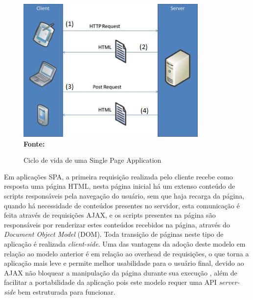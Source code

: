 \begin{figure}[!ht]
	\centering	
	\caption[\hspace{0.1cm} Ciclo de vida de uma Single Page Application.]{Ciclo de vida de uma Single Page Application}
	  \vspace{-0.4cm}
	\includegraphics[width=.8\textwidth]{figuras/spa.png}
	 \vspace{-0.3cm}
	\\\textbf{\footnotesize Fonte: \cite{spa02}}
	\label{fig:spa}
\end{figure}

Em aplicações SPA, a primeira requisição realizada pelo cliente recebe como resposta uma página HTML, nesta página inicial há um extenso conteúdo de
scripts responsáveis pela navegação do usuário, sem que haja recarga da página, quando há necessidade de conteúdos presentes no servidor, esta 
comunicação é feita através de requisições AJAX, e os scripts presentes na página são responsáveis por renderizar estes conteúdos recebidos na página,
através do \textit{Document Object Model} (DOM). Toda transição de páginas neste tipo de aplicação é realizada \textit{client-side}. Uma das vantagens
da adoção deste modelo em relação ao modelo anterior é em relação ao overhead de requisições, o que torna a aplicação mais leve e permite melhor 
usabilidade para o usuário final, devido ao AJAX não bloquear a manipulação da página durante sua execução \cite{spa01}, além de facilitar a 
portabilidade da aplicação pois este modelo requer uma API \textit{server-side} bem estruturada para funcionar.